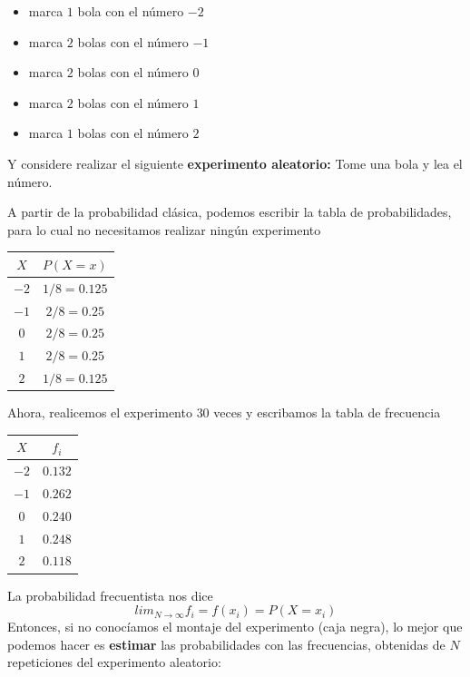 \documentclass[
]{book}
\providecommand{\tightlist}{%
  \setlength{\itemsep}{0pt}\setlength{\parskip}{0pt}}
\begin{document}
\begin{itemize}
\tightlist
\item
  marca \(1\) bola con el número \(-2\)
\item
  marca \(2\) bolas con el número \(-1\)
\item
  marca \(2\) bolas con el número \(0\)
\item
  marca \(2\) bolas con el número \(1\)
\item
  marca \(1\) bolas con el número \(2\)
\end{itemize}

Y considere realizar el siguiente \textbf{experimento aleatorio:} Tome una bola y lea el número.

A partir de la probabilidad clásica, podemos escribir la tabla de probabilidades, para lo cual no necesitamos realizar ningún experimento

\begin{longtable}[]{@{}cc@{}}
\toprule\noalign{}
\(X\) & \(P(X=x)\) \\
\midrule\noalign{}
\endhead
\bottomrule\noalign{}
\endlastfoot
\(-2\) & \(1/8=0.125\) \\
\(-1\) & \(2/8=0.25\) \\
\(0\) & \(2/8=0.25\) \\
\(1\) & \(2/8=0.25\) \\
\(2\) & \(1/8=0.125\) \\
\end{longtable}

Ahora, realicemos el experimento \(30\) veces y escribamos la tabla de frecuencia

\begin{longtable}[]{@{}cc@{}}
\toprule\noalign{}
\(X\) & \(f_i\) \\
\midrule\noalign{}
\endhead
\bottomrule\noalign{}
\endlastfoot
\(-2\) & \(0.132\) \\
\(-1\) & \(0.262\) \\
\(0\) & \(0.240\) \\
\(1\) & \(0.248\) \\
\(2\) & \(0.118\) \\
\end{longtable}

La probabilidad frecuentista nos dice
\[lim_{N \rightarrow \infty} f_i = f(x_i)=P(X=x_i)\]
Entonces, si no conocíamos el montaje del experimento (caja negra), lo mejor que podemos hacer es \textbf{estimar} las probabilidades con las frecuencias, obtenidas de \(N\) repeticiones del experimento aleatorio:
\end{document}
